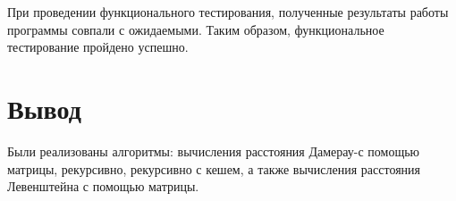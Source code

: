 При проведении функционального тестирования, полученные результаты работы программы совпали с ожидаемыми. Таким образом, функциональное тестирование пройдено успешно.

\section*{Вывод}

Были реализованы алгоритмы: вычисления расстояния Дамерау- с помощью матрицы, рекурсивно, рекурсивно с кешем, а также вычисления расстояния Левенштейна с помощью матрицы.